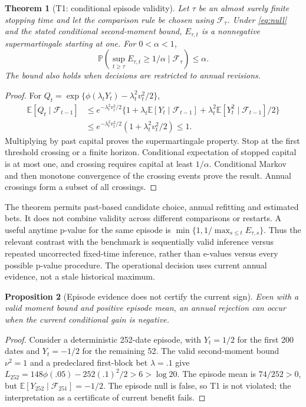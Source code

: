\documentclass[11pt,a4paper]{article}
\newtheorem{theorem}{Theorem}
\newtheorem{proposition}[theorem]{Proposition}
\theoremstyle{remark}\newtheorem{remark}[theorem]{Remark}
\newcommand{\E}{\mathbb E}\newcommand{\Prb}{\mathbb P}
\newcommand{\F}{\mathcal F}\newcommand{\G}{\mathcal G}\newcommand{\W}{\mathcal W}
\begin{document}
\begin{theorem}[T1: conditional episode validity]
Let $\tau$ be an almost surely finite stopping time and let the comparison rule
be chosen using $\F_\tau$. Under \eqref{eq:null} and the stated conditional
second-moment bound, $E_{\tau,t}$ is a nonnegative supermartingale starting at
one. For $0<\alpha<1$,
\begin{equation}
 \Prb\!\left(\sup_{t\ge\tau}E_{\tau,t}\ge1/\alpha\mid\F_\tau\right)\le\alpha.
\end{equation}
The bound also holds when decisions are restricted to annual revisions.
\end{theorem}
\begin{proof}
For $Q_t=\exp\{\phi(\lambda_tY_t)-\lambda_t^2v_t^2/2\}$,
\begin{align*}
 \E[Q_t\mid\F_{t-1}]
 &\le e^{-\lambda_t^2v_t^2/2}
 \{1+\lambda_t\E[Y_t\mid\F_{t-1}]+\lambda_t^2\E[Y_t^2\mid\F_{t-1}]/2\}\\
 &\le e^{-\lambda_t^2v_t^2/2}(1+\lambda_t^2v_t^2/2)\le1.
\end{align*}
Multiplying by past capital proves the supermartingale property. Stop at the
first threshold crossing or a finite horizon. Conditional expectation of
stopped capital is at most one, and crossing requires capital at least
$1/\alpha$. Conditional Markov and then monotone convergence of the crossing
events prove the result. Annual crossings form a subset of all crossings.
\end{proof}

The theorem permits past-based candidate choice, annual refitting and estimated
bets. It does not combine validity across different comparisons or restarts.
A useful anytime p-value for the same episode is
$\min\{1,1/\max_{s\le t}E_{\tau,s}\}$. Thus the relevant contrast with the
benchmark is sequentially valid inference versus repeated uncorrected
fixed-time inference, rather than e-values versus every possible p-value
procedure. The operational decision uses current annual evidence, not a stale
historical maximum.

\begin{proposition}[Episode evidence does not certify the current sign]
Even with a valid moment bound and positive episode mean, an annual rejection
can occur when the current conditional gain is negative.
\end{proposition}
\begin{proof}
Consider a deterministic 252-date episode, with $Y_t=1/2$ for the first 200
dates and $Y_t=-1/2$ for the remaining 52. The valid second-moment bound
$\nu^2=1$ and a predeclared first-block bet $\lambda=.1$ give
$L_{252}=148\phi(.05)-252(.1)^2/2>6>\log20$.
The episode mean is $74/252>0$, but
$\E[Y_{252}\mid\F_{251}]=-1/2$. The episode null is false, so T1 is not
violated; the interpretation as a certificate of current benefit fails.
\end{proof}
\end{document}

